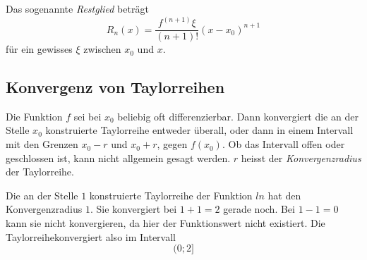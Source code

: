 Das sogenannte \textit{Restglied} beträgt
%
\begin{displaymath}
	R_n(x) = \frac{f^{(n+1)}\xi}{(n+1)!}(x-x_0)^{n+1}
\end{displaymath}
%
für ein gewisses $\xi$ zwischen $x_0$ und $x$.


\subsection{Konvergenz von Taylorreihen}

Die Funktion $f$ sei bei $x_0$ beliebig oft differenzierbar. Dann konvergiert die an der Stelle
$x_0$ konstruierte Taylorreihe entweder überall, oder dann in einem Intervall mit den Grenzen
$x_0 - r$ und $x_0 + r$, gegen $f(x_0)$. Ob das Intervall offen oder geschlossen ist, kann nicht
allgemein gesagt werden. $r$ heisst der \textit{Konvergenzradius} der Taylorreihe.

Die an der Stelle $1$ konstruierte Taylorreihe der Funktion $ln$ hat den Konvergenzradius $1$. Sie
konvergiert bei $1 + 1 = 2$ gerade noch. Bei $1 - 1 = 0$ kann sie nicht konvergieren, da hier der
Funktionswert nicht existiert. Die Taylorreihekonvergiert also im Intervall
%
\begin{displaymath}
(0;2]
\end{displaymath}
